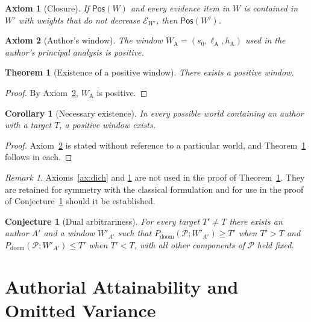 \documentclass[11pt]{article}
\newtheorem{axiom}{Axiom}[section]
\newtheorem{theorem}{Theorem}[section]
\newtheorem{corollary}{Corollary}[section]
\newtheorem{conjecture}{Conjecture}[section]
\theoremstyle{remark}
\newtheorem{remark}{Remark}[section]
\newcommand{\PD}{P_{\mathrm{doom}}}
\begin{document}
\begin{axiom}[Closure]\label{ax:closure}
If $\mathsf{Pos}(W)$ and every evidence item in $W$ is contained in $W'$ with weights that do not decrease $\mathcal{E}_{W'}$, then $\mathsf{Pos}(W')$.
\end{axiom}

\begin{axiom}[Author's window]\label{ax:authors}
The window $W_{\mathrm{A}}=(s_0,\ell_{\mathrm{A}},h_{\mathrm{A}})$ used in the author's principal analysis is positive.
\end{axiom}

\begin{theorem}[Existence of a positive window]\label{thm:pos}
There exists a positive window.
\end{theorem}
\begin{proof}
By Axiom~\ref{ax:authors}, $W_{\mathrm{A}}$ is positive. \qedhere
\end{proof}

\begin{corollary}[Necessary existence]\label{cor:nec}
In every possible world containing an author with a target $T$, a positive window exists.
\end{corollary}
\begin{proof}
Axiom~\ref{ax:authors} is stated without reference to a particular world, and Theorem~\ref{thm:pos} follows in each. \qedhere
\end{proof}

\begin{remark}
Axioms~\ref{ax:dich} and \ref{ax:closure} are not used in the proof of Theorem~\ref{thm:pos}. They are retained for symmetry with the classical formulation and for use in the proof of Conjecture~\ref{conj:dual} should it be established.
\end{remark}

\begin{conjecture}[Dual arbitrariness]\label{conj:dual}
For every target $T'\neq T$ there exists an author $A'$ and a window $W'_{A'}$ such that $\PD(\mathcal{P};W'_{A'})\ge T'$ when $T'>T$ and $\PD(\mathcal{P};W'_{A'})\le T'$ when $T'<T$, with all other components of $\mathcal{P}$ held fixed.
\end{conjecture}

\section{Authorial Attainability and Omitted Variance}\label{sec:attain}
\end{document}
